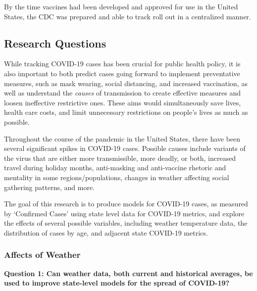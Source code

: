 \documentclass[11pt]{article}
\begin{document}
	By the time vaccines had been developed and approved for use in the United States, the CDC was prepared and able to track roll out in a centralized manner. 
	

\subsection{Research Questions}

While tracking COVID-19 cases has been crucial for public health policy, it is also important to both predict cases going forward to implement preventative measures, such as mask wearing, social distancing, and increased vaccination, as well as understand the \textit{causes} of transmission to create effective measures and loosen ineffective restrictive ones. These aims would simultaneously save lives, health care costs, and limit unnecessary restrictions on people's lives as much as possible. 

Throughout the course of the pandemic in the United States, there have been several significant spikes in COVID-19 cases. Possible causes include variants of the virus that are either more transmissible, more deadly, or both, increased travel during holiday months, anti-masking and anti-vaccine rhetoric and mentality in some regions/populations, changes in weather affecting social gathering patterns, and more. 

The goal of this research is to produce models for COVID-19 cases, as measured by `Confirmed Cases' using state level data for COVID-19 metrics, and explore the effects of several possible variables, including weather temperature data,  the distribution of cases by age, and adjacent state COVID-19 metrics. 


\subsubsection{Affects of Weather}


\noindent\textbf{Question 1: Can weather data, both current and historical averages, be used to improve state-level models for the spread of COVID-19?}
\end{document}
